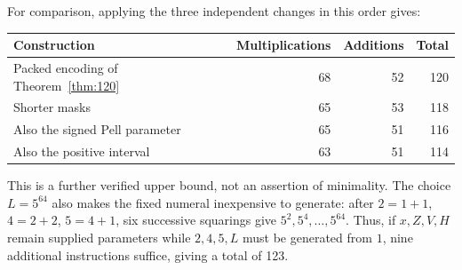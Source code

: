 For comparison, applying the three independent changes in this order gives:
\begin{center}
\begin{tabular}{@{}lrrr@{}}
\toprule
Construction & Multiplications & Additions & Total\\
\midrule
Packed encoding of Theorem~\ref{thm:120} & 68 & 52 & 120\\
Shorter masks & 65 & 53 & 118\\
Also the signed Pell parameter & 65 & 51 & 116\\
Also the positive interval & 63 & 51 & 114\\
\bottomrule
\end{tabular}
\end{center}

This is a further verified upper bound, not an assertion of minimality.
The choice $L=5^{64}$ also makes the fixed numeral inexpensive to
generate: after $2=1+1$, $4=2+2$, $5=4+1$, six successive squarings
give $5^2,5^4,\ldots,5^{64}$. Thus, if $x,Z,V,H$ remain supplied
parameters while $2,4,5,L$ must be generated from $1$, nine additional
instructions suffice, giving a total of 123.
